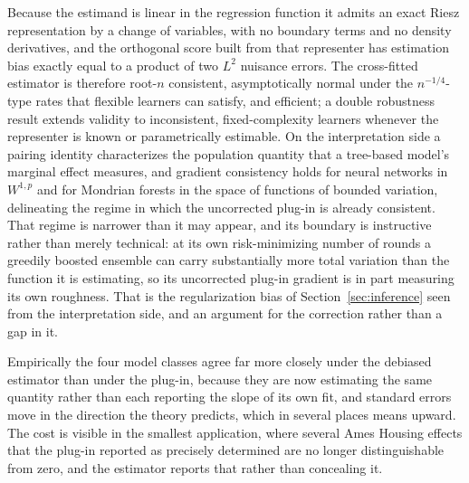 \documentclass[12pt,a4paper]{article}
\numberwithin{equation}{section}
\theoremstyle{plain}
\theoremstyle{definition}
\begin{document}
	Because the estimand is linear in the regression function it admits an exact
	Riesz representation by a change of variables, with no boundary terms and no
	density derivatives, and the orthogonal score built from that representer has
	estimation bias exactly equal to a product of two $L^2$ nuisance errors. The
	cross-fitted estimator is therefore root-$n$ consistent, asymptotically
	normal under the $n^{-1/4}$-type rates that flexible learners can satisfy,
	and efficient; a double robustness result extends validity to inconsistent,
	fixed-complexity learners whenever the representer is known or parametrically
	estimable. On the interpretation side a pairing identity characterizes the
	population quantity that a tree-based model's marginal effect measures, and
	gradient consistency holds for neural networks in $W^{1,p}$ and for Mondrian
	forests in the space of functions of bounded variation, delineating the
	regime in which the uncorrected plug-in is already consistent. That regime is
	narrower than it may appear, and its boundary is instructive rather than
	merely technical: at its own risk-minimizing number of rounds a greedily
	boosted ensemble can carry substantially more total variation than the
	function it is estimating, so its uncorrected plug-in gradient is in part
	measuring its own roughness. That is the regularization bias of
	Section~\ref{sec:inference} seen from the interpretation side, and an
	argument for the correction rather than a gap in it.

	Empirically the four model classes agree far more closely under the debiased
	estimator than under the plug-in, because they are now estimating the same
	quantity rather than each reporting the slope of its own fit, and standard
	errors move in the direction the theory predicts, which in several places
	means upward. The cost is visible in the smallest application, where several
	Ames Housing effects that the plug-in reported as precisely determined are no
	longer distinguishable from zero, and the estimator reports that rather than
	concealing it.
\end{document}
